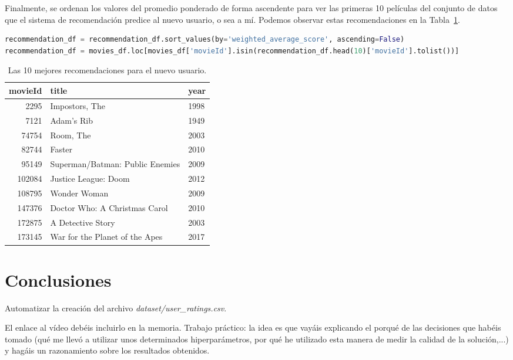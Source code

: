 \documentclass{uimppracticas}
\begin{document}
Finalmente, se ordenan los valores del promedio ponderado de forma ascendente para ver las primeras 10 películas del conjunto de datos que el sistema de recomendación predice al nuevo usuario, o sea a mí. Podemos observar estas recomendaciones en la Tabla~\ref{recomendaciones_finales}.

\begin{lstlisting}[language=python, basicstyle=\small]
recommendation_df = recommendation_df.sort_values(by='weighted_average_score', ascending=False)
recommendation_df = movies_df.loc[movies_df['movieId'].isin(recommendation_df.head(10)['movieId'].tolist())]
\end{lstlisting}

\begin{table}[H]
	\centering
	\begin{tabular}{rll}
		\toprule
		movieId &                         title &  year \\
		\midrule
		2295 &                   Impostors, The &  1998 \\
		7121 &                       Adam's Rib &  1949 \\
		74754 &                        Room, The &  2003 \\
		82744 &                           Faster &  2010 \\
		95149 &  Superman/Batman: Public Enemies &  2009 \\
		102084 &             Justice League: Doom &  2012 \\
		108795 &                     Wonder Woman &  2009 \\
		147376 &    Doctor Who: A Christmas Carol &  2010 \\
		172875 &                A Detective Story &  2003 \\
		173145 &   War for the Planet of the Apes &  2017 \\
		\bottomrule
	\end{tabular}
	\caption{Las 10 mejores recomendaciones para el nuevo usuario.}
	\label{recomendaciones_finales}
\end{table}


\section{Conclusiones}

Automatizar la creación del archivo \textit{dataset/user\_ratings.csv}.

El enlace al vídeo debéis incluirlo en la memoria. Trabajo práctico: la idea es que vayáis explicando el porqué de las decisiones que habéis tomado (qué me llevó a utilizar unos determinados hiperparámetros, por qué he utilizado esta manera de medir la calidad de la solución,...) y hagáis un razonamiento sobre los resultados obtenidos.
\end{document}
